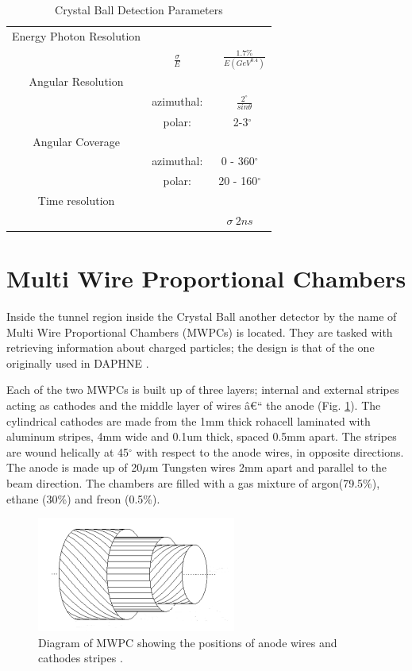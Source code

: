 \begin{table}[ht]
\caption{Crystal Ball Detection Parameters}
\centering
\begin{tabular}{c c c}
\hline\hline
Energy Photon Resolution & &  \\
 & $\frac{\sigma}{E}$ & ~ $\frac{1.7\%}{E(GeV^{0.4})}$ \\
\hline
Angular Resolution & & \\
 & azimuthal: & ~ $\frac{2^{\circ}}{sin\theta}$ \\
 & polar: & ~2-3$^{\circ}$ \\
\hline
Angular Coverage & & \\
 & azimuthal: & 0 - 360$^{\circ}$ \\
 & polar: & 20 - 160$^{\circ}$ \\
\hline
Time resolution & & \\
 & & $\sigma ~ 2ns$ \\ [1ex]
\hline\hline
\end{tabular}
\label{table_cbparam}
\end{table} 
 

\section{Multi Wire Proportional Chambers}

\indent Inside the tunnel region inside the Crystal Ball another detector by the name of Multi Wire Proportional Chambers (MWPCs) is located. They are tasked with retrieving  information  about  charged particles;  the  design  is that  of  the  one originally used in DAPHNE \cite{audit}.

\indent Each of the two MWPCs is built up of three layers; internal and external stripes acting as cathodes and the middle layer of wires â€“ the anode (Fig. \ref{mwpc}). The cylindrical  cathodes  are  made  from  the  1mm  thick  rohacell  laminated  with aluminum stripes, 4mm wide and  0.1um thick, spaced 0.5mm apart. The stripes are  wound  helically  at  45$^{\circ}$  with  respect  to  the  anode  wires,  in  opposite directions.  The  anode  is  made  up  of  20$\mu$m  Tungsten  wires  2mm  apart  and parallel to the beam direction. The chambers are filled with a gas mixture of argon(79.5\%), ethane (30\%) and freon (0.5\%).

\begin{figure}[H]
\begin{center}
\includegraphics[scale=1.0]{mwpc.png}
\caption{Diagram of MWPC showing the positions of anode wires and cathodes stripes \cite{jalbert}.}
\label{mwpc}
\end{center}
\end{figure}


